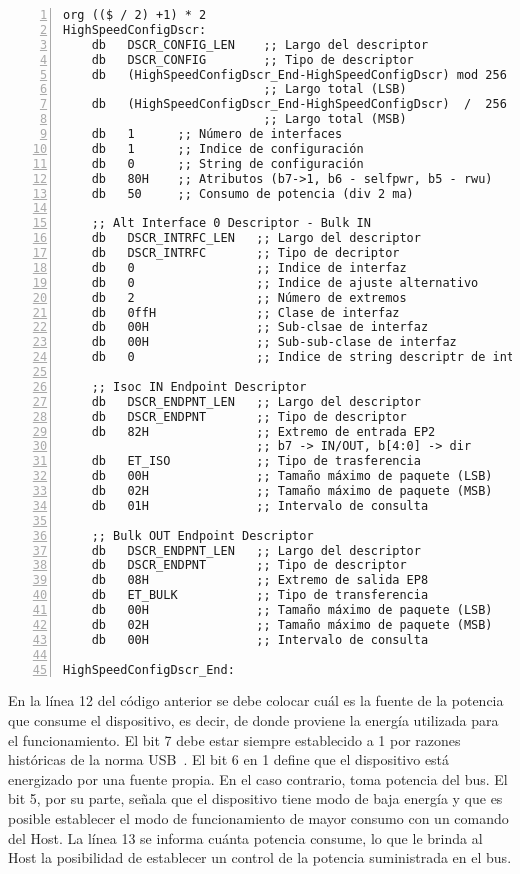 	\begin{lstlisting}[language={[x86masm]Assembler},backgroundcolor=\color{gray!30},numbers=left]
org (($ / 2) +1) * 2
HighSpeedConfigDscr:
	db   DSCR_CONFIG_LEN	;; Largo del descriptor
	db   DSCR_CONFIG        ;; Tipo de descriptor
	db   (HighSpeedConfigDscr_End-HighSpeedConfigDscr) mod 256
							;; Largo total (LSB)
	db   (HighSpeedConfigDscr_End-HighSpeedConfigDscr)  /  256 
							;; Largo total (MSB)
	db   1      ;; Número de interfaces
	db   1      ;; Indice de configuración
	db   0		;; String de configuración
	db   80H	;; Atributos (b7->1, b6 - selfpwr, b5 - rwu)
	db   50		;; Consumo de potencia (div 2 ma)
	
	;; Alt Interface 0 Descriptor - Bulk IN
	db   DSCR_INTRFC_LEN   ;; Largo del descriptor
	db   DSCR_INTRFC       ;; Tipo de decriptor
	db   0                 ;; Indice de interfaz
	db   0                 ;; Indice de ajuste alternativo
	db   2                 ;; Número de extremos
	db   0ffH              ;; Clase de interfaz
	db   00H               ;; Sub-clsae de interfaz
	db   00H               ;; Sub-sub-clase de interfaz
	db   0                 ;; Indice de string descriptr de interfaz
	
	;; Isoc IN Endpoint Descriptor 
	db   DSCR_ENDPNT_LEN   ;; Largo del descriptor
	db   DSCR_ENDPNT       ;; Tipo de descriptor
	db   82H               ;; Extremo de entrada EP2
						   ;; b7 -> IN/OUT, b[4:0] -> dir
	db   ET_ISO            ;; Tipo de trasferencia
	db   00H               ;; Tamaño máximo de paquete (LSB)
	db   02H               ;; Tamaño máximo de paquete (MSB) 
	db   01H               ;; Intervalo de consulta
	
	;; Bulk OUT Endpoint Descriptor
	db   DSCR_ENDPNT_LEN   ;; Largo del descriptor
	db   DSCR_ENDPNT       ;; Tipo de descriptor
	db   08H               ;; Extremo de salida EP8
	db   ET_BULK           ;; Tipo de transferencia
	db   00H               ;; Tamaño máximo de paquete (LSB)
	db   02H               ;; Tamaño máximo de paquete (MSB)
	db   00H               ;; Intervalo de consulta
	
HighSpeedConfigDscr_End:
	\end{lstlisting}
	
	En la línea 12 del código anterior se debe colocar cuál es la fuente de la potencia que consume el dispositivo, es decir, de donde proviene la energía utilizada para el funcionamiento. El bit 7 debe estar siempre establecido a 1 por razones históricas de la norma USB~\cite{USBspec}. El bit 6 en 1 define que el dispositivo está energizado por una fuente propia. En el caso contrario, toma potencia del bus. El bit 5, por su parte, señala que el dispositivo tiene modo de baja energía y que es posible establecer el modo de funcionamiento de mayor consumo con un comando del Host. La línea 13 se informa cuánta potencia consume, lo que le brinda al Host la posibilidad de establecer un control de la potencia suministrada en el bus.
	
